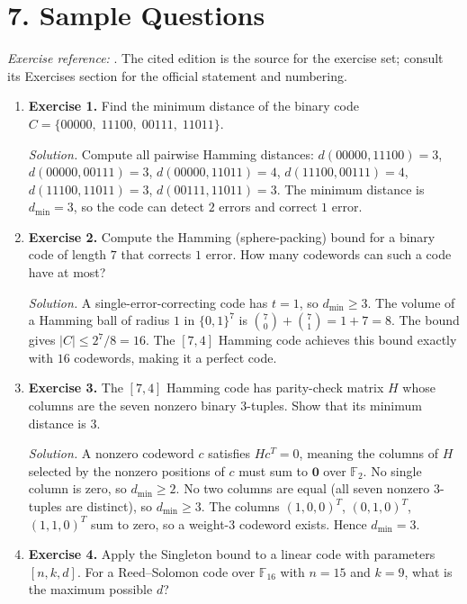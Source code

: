 \section*{7. Sample Questions}
\emph{Exercise reference:} \cite{coding_theory_ref1}. The cited edition is the source for the exercise set; consult its Exercises section for the official statement and numbering.
\begin{enumerate}[leftmargin=*,itemsep=0.9em]

\item \textbf{Exercise 1.} Find the minimum distance of the binary code $C=\{00000,\;11100,\;00111,\;11011\}$.

\emph{Solution.} Compute all pairwise Hamming distances: $d(00000,11100)=3$, $d(00000,00111)=3$, $d(00000,11011)=4$, $d(11100,00111)=4$, $d(11100,11011)=3$, $d(00111,11011)=3$. The minimum distance is $d_{\min}=3$, so the code can detect $2$ errors and correct $1$ error.

\item \textbf{Exercise 2.} Compute the Hamming (sphere-packing) bound for a binary code of length $7$ that corrects $1$ error. How many codewords can such a code have at most?

\emph{Solution.} A single-error-correcting code has $t=1$, so $d_{\min}\geq 3$. The volume of a Hamming ball of radius $1$ in $\{0,1\}^7$ is $\binom{7}{0}+\binom{7}{1}=1+7=8$. The bound gives $|C|\leq 2^7/8=16$. The $[7,4]$ Hamming code achieves this bound exactly with $16$ codewords, making it a perfect code.

\item \textbf{Exercise 3.} The $[7,4]$ Hamming code has parity-check matrix $H$ whose columns are the seven nonzero binary $3$-tuples. Show that its minimum distance is $3$.

\emph{Solution.} A nonzero codeword $c$ satisfies $Hc^T=0$, meaning the columns of $H$ selected by the nonzero positions of $c$ must sum to $\mathbf{0}$ over $\mathbb{F}_2$. No single column is zero, so $d_{\min}\geq 2$. No two columns are equal (all seven nonzero $3$-tuples are distinct), so $d_{\min}\geq 3$. The columns $(1,0,0)^T$, $(0,1,0)^T$, $(1,1,0)^T$ sum to zero, so a weight-$3$ codeword exists. Hence $d_{\min}=3$.

\item \textbf{Exercise 4.} Apply the Singleton bound to a linear code with parameters $[n,k,d]$. For a Reed--Solomon code over $\mathbb{F}_{16}$ with $n=15$ and $k=9$, what is the maximum possible $d$?


\end{enumerate}
